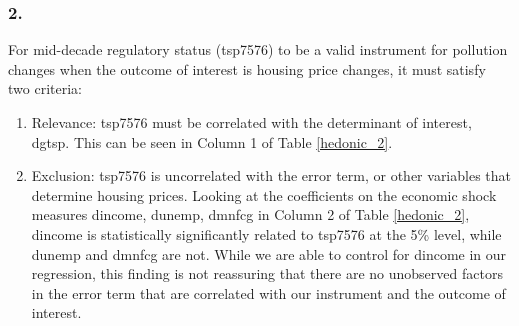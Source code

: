 \documentclass[12pt]{article}
\begin{document}
\subsubsection*{2.}
For mid-decade regulatory status (tsp7576) to be a valid instrument for pollution changes when the outcome of interest is housing price changes, it must satisfy two criteria:
\begin{enumerate}
\item Relevance: tsp7576 must be correlated with the determinant of interest, dgtsp. This can be seen in Column 1 of Table \ref{hedonic_2}.
\item Exclusion: tsp7576 is uncorrelated with the error term, or other variables that determine housing prices. Looking at the coefficients on the economic shock measures dincome, dunemp, dmnfcg in Column 2 of Table \ref{hedonic_2}, dincome is statistically significantly related to tsp7576 at the 5\% level, while dunemp and dmnfcg are not. While we are able to control for dincome in our regression, this finding is not reassuring that there are no unobserved factors in the error term that are correlated with our instrument and the outcome of interest.
\end{enumerate}
\end{document}
